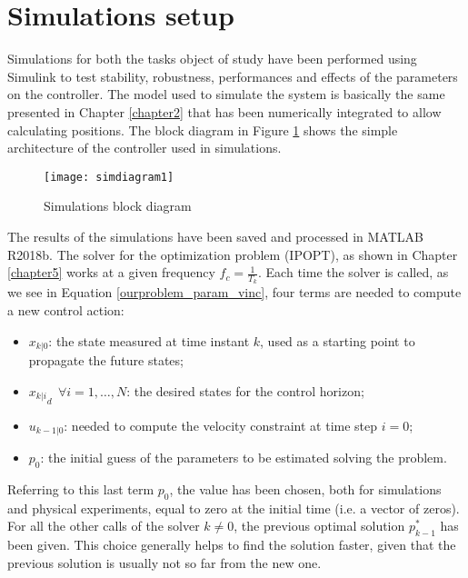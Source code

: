 \section{Simulations setup}

Simulations for both the tasks object of study have been performed using Simulink to test stability, robustness, performances and effects of the parameters on the controller. The model used to simulate the system is basically the same presented in Chapter \ref{chapter2} that has been numerically integrated to allow calculating positions. The block diagram in Figure \ref{simdiagram1} shows the simple architecture of the controller used in simulations.

\begin{figure}[h!]
\texttt{[image: simdiagram1]}
\centering
\caption{Simulations block diagram} 
\label{simdiagram1}
\end{figure}

The results of the simulations have been saved and processed in MATLAB R2018b. The solver for the optimization problem (IPOPT), as shown in Chapter \ref{chapter5} works at a given frequency $f_c=\frac{1}{T_k}$. Each time the solver is called, as we see in Equation \ref{ourproblem_param_vinc}, four terms are needed to compute a new control action: 
\begin{itemize}
\item $x_{k|0}$: the state measured at time instant $k$, used as a starting point to propagate the future states;
\item ${x_{k|i}}_d \ \ \forall i=1,\dots,N$: the desired states for the control horizon;
\item $u_{k-1|0}$: needed to compute the velocity constraint at time step $i=0$;
\item $p_0$: the initial guess of the parameters to be estimated solving the problem.
\end{itemize}
Referring to this last term $p_0$, the value has been chosen, both for simulations and physical experiments, equal to zero at the initial time (i.e. a vector of zeros). For all the other calls of the solver $k\neq0$, the previous optimal solution $p_{k-1}^*$ has been given. This choice generally helps to find the solution faster, given that the previous solution is usually not so far from the new one.

